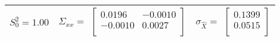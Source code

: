 \begin{table}[H]
\centering
\begin{tabular}{|c|c|c|}
\toprule
$S_0^2 = 1.00$ & %
$\Sigma_{xx} = $ $
 \begin{bmatrix}
0.0196&-0.0010\\
-0.0010&0.0027\\
\end{bmatrix}
$
& %
$\sigma_{\hat{X}} = $ $
 \begin{bmatrix}
0.1399\\
0.0515\\
\end{bmatrix}
$
\\ %
\bottomrule
\end{tabular}
\end{table}
